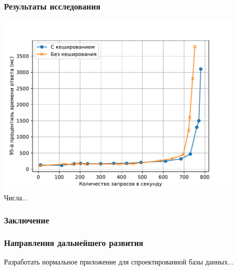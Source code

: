 \documentclass{beamer}
\begin{document}
\begin{frame}
    \frametitle{Результаты исследования}
    \centering
	\includegraphics[width=0.9\textwidth]{img/95-resp-time.pdf}
    Числа...
\end{frame}

\begin{frame}
    \frametitle{Заключение}
\end{frame}

\begin{frame}
    \frametitle{Направления дальнейшего развития}
    Разработать нормальное приложение для спроектированной базы данных...
\end{frame}
\end{document}
